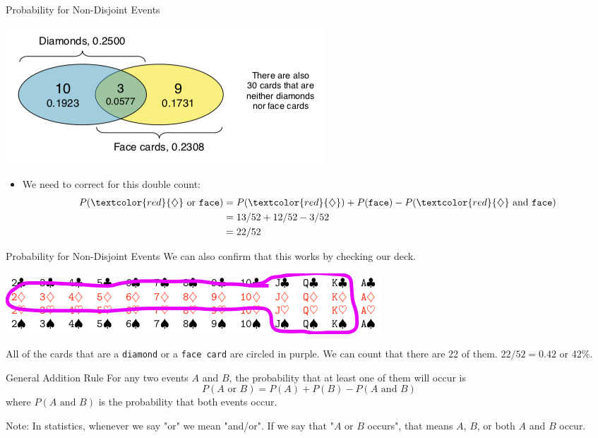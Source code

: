 \begin{frame}{Probability for Non-Disjoint Events}
    \begin{center}
        \includegraphics[scale=0.4]{images/venndiagram.png}
    \end{center}
    \begin{itemize}
        \item We need to correct for this double count:
        \begin{align*}
        P(\textcolor{red}{\diamondsuit} \text{ or } \texttt{face}) 
        & = P(\textcolor{red}{\diamondsuit})+P(\texttt{face}) - P(\textcolor{red}{\diamondsuit} \text{ and } \texttt{face}) \\
        & =13/52 + 12/52 -3/52 \\
        & = 22/52
        \end{align*}
    \end{itemize}
\end{frame}

\begin{frame}{Probability for Non-Disjoint Events}
    We can also confirm that this works by checking our deck.
    
    \begin{center}
        \includegraphics[scale=0.5]{images/cards2.png}
    \end{center}
    
    All of the cards that are a \texttt{diamond} or a \texttt{face card} are circled in purple. We can count that there are 22 of them. $22/52 = 0.42$ or 42\%.
\end{frame}

\begin{frame}{General Addition Rule}
    For any two events $A$ and $B$, the probability that at least one of them will occur is
    \[
        P(A \text{ or } B) = P(A) + P(B) - P(A \text{ and } B)
    \]
    where $P(A \text{ and } B)$ is the probability that both events occur.
    
    \vspace{18pt}Note: In statistics, whenever we say "or" we mean "and/or". If we say that "$A$ or $B$ occurs", that means $A$, $B$, or both $A$ and $B$ occur.
\end{frame}

